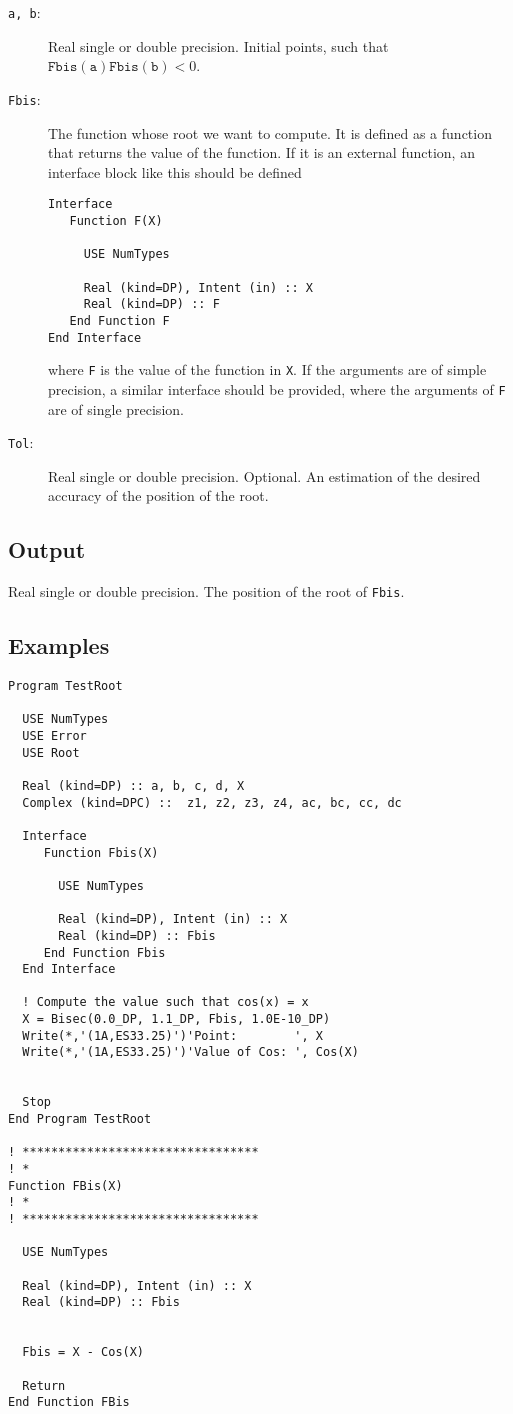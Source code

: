 \begin{description}
\item[\texttt{a, b}:] Real single or double precision. Initial points,
  such that $\mathtt{Fbis(a)Fbis(b)} < 0$.
\item[\texttt{Fbis}:] The function whose root we want to compute. It
  is defined as a function that returns the value of the function. If
  it is an external function, an interface block like this should be
  defined 
\begin{verbatim}
Interface
   Function F(X)

     USE NumTypes

     Real (kind=DP), Intent (in) :: X
     Real (kind=DP) :: F
   End Function F
End Interface
\end{verbatim}
where \texttt{F} is the value of the function in \texttt{X}. If the
arguments are of simple precision, a similar interface should be
provided, where the arguments of \texttt{F} are of single
precision. 
\item[\texttt{Tol}:] Real single or double precision. Optional. An
  estimation of the desired accuracy of the  position of the root.
\end{description}

\subsection{Output}

Real single or double precision. The position of the root of
\texttt{Fbis}.

\subsection{Examples}

\begin{verbatim}
Program TestRoot

  USE NumTypes
  USE Error
  USE Root

  Real (kind=DP) :: a, b, c, d, X
  Complex (kind=DPC) ::  z1, z2, z3, z4, ac, bc, cc, dc

  Interface
     Function Fbis(X)
       
       USE NumTypes
       
       Real (kind=DP), Intent (in) :: X
       Real (kind=DP) :: Fbis
     End Function Fbis
  End Interface
  
  ! Compute the value such that cos(x) = x
  X = Bisec(0.0_DP, 1.1_DP, Fbis, 1.0E-10_DP)
  Write(*,'(1A,ES33.25)')'Point:        ', X
  Write(*,'(1A,ES33.25)')'Value of Cos: ', Cos(X)


  Stop
End Program TestRoot

! *********************************
! *
Function FBis(X)
! *
! *********************************  

  USE NumTypes
  
  Real (kind=DP), Intent (in) :: X
  Real (kind=DP) :: Fbis

  
  Fbis = X - Cos(X)

  Return
End Function FBis
\end{verbatim}

